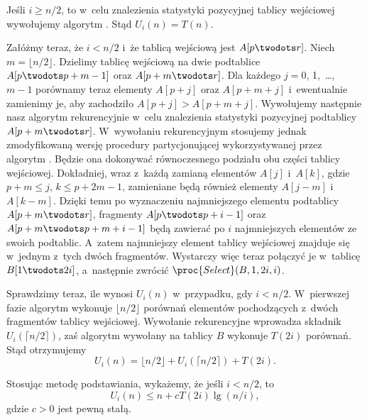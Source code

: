 \subproblem %

\noindent Jeśli $i\ge n/2$, to w~celu znalezienia  statystyki pozycyjnej tablicy wejściowej wywołujemy algorytm . Stąd $U_i(n)=T(n)$.

Załóżmy teraz, że $i<n/2$ i~że tablicą wejściową jest $A[p\twodots r]$. Niech $m=\lfloor n/2\rfloor$. Dzielimy tablicę wejściową na dwie podtablice $A[p\twodots p+m-1]$ oraz $A[p+m\twodots r]$. Dla każdego $j=0$, 1,~\dots,~$m-1$ porównamy teraz elementy $A[p+j]$ oraz $A[p+m+j]$ i~ewentualnie zamienimy je, aby zachodziło $A[p+j]>A[p+m+j]$. Wywołujemy następnie nasz algorytm rekurencyjnie w~celu znalezienia  statystyki pozycyjnej podtablicy $A[p+m\twodots r]$. W~wywołaniu rekurencyjnym stosujemy jednak zmodyfikowaną wersję procedury partycjonującej wykorzystywanej przez algorytm . Będzie ona dokonywać równoczesnego podziału obu części tablicy wejściowej. Dokładniej, wraz z~każdą zamianą elementów $A[j]$ i~$A[k]$, gdzie $p+m\le j$, $k\le p+2m-1$, zamieniane będą również elementy $A[j-m]$ i~$A[k-m]$. Dzięki temu po wyznaczeniu  najmniejszego elementu podtablicy $A[p+m\twodots r]$, fragmenty $A[p\twodots p+i-1]$ oraz $A[p+m\twodots p+m+i-1]$ będą zawierać po $i$ najmniejszych elementów ze swoich podtablic. A~zatem  najmniejszy element tablicy wejściowej znajduje się w~jednym z~tych dwóch fragmentów. Wystarczy więc teraz połączyć je w~tablicę $B[1\twodots2i]$, a~następnie zwrócić $\proc{Select}(B,1,2i,i)$.

Sprawdzimy teraz, ile wynosi $U_i(n)$ w~przypadku, gdy $i<n/2$. W~pierwszej fazie algorytm wykonuje $\lfloor n/2\rfloor$ porównań elementów pochodzących z~dwóch fragmentów tablicy wejściowej. Wywołanie rekurencyjne wprowadza składnik $U_i(\lceil n/2\rceil)$, zaś algorytm  wywołany na tablicy $B$ wykonuje $T(2i)$ porównań. Stąd otrzymujemy
\[
    U_i(n) = \lfloor n/2\rfloor+U_i(\lceil n/2\rceil)+T(2i).
\]

\subproblem %
Stosując metodę podstawiania, wykażemy, że jeśli $i<n/2$, to
\[
	U_i(n) \le n+cT(2i)\lg(n/i),
\]
gdzie $c>0$ jest pewną stałą.

